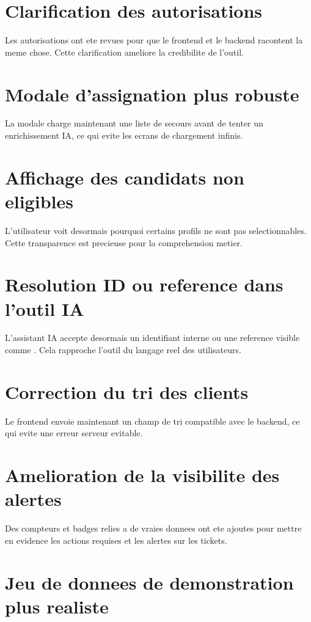 \section{Clarification des autorisations}

Les autorisations ont ete revues pour que le frontend et le backend racontent la meme chose. Cette clarification ameliore la credibilite de l'outil.

\section{Modale d'assignation plus robuste}

La modale charge maintenant une liste de secours avant de tenter un enrichissement IA, ce qui evite les ecrans de chargement infinis.

\section{Affichage des candidats non eligibles}

L'utilisateur voit desormais pourquoi certains profils ne sont pas selectionnables. Cette transparence est precieuse pour la comprehension metier.

\section{Resolution ID ou reference dans l'outil IA}

L'assistant IA accepte desormais un identifiant interne ou une reference visible comme . Cela rapproche l'outil du langage reel des utilisateurs.

\section{Correction du tri des clients}

Le frontend envoie maintenant un champ de tri compatible avec le backend, ce qui evite une erreur serveur evitable.

\section{Amelioration de la visibilite des alertes}

Des compteurs et badges relies a de vraies donnees ont ete ajoutes pour mettre en evidence les actions requises et les alertes sur les tickets.

\section{Jeu de donnees de demonstration plus realiste}

